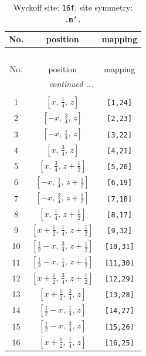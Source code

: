 \documentclass[fleqn,8pt]{jsarticle}
\begin{document}
\renewcommand{\arraystretch}{1.2}
\begin{longtable}{ccc}
\caption{Wyckoff site: {\tt 16f}, site symmetry: {\tt .m'.}}
 \\
 \hline \hline
No. & position & mapping \\ \hline \endfirsthead

\multicolumn{2}{l}{\tablename\ \thetable{}} \\
 \hline \hline
No. & position & mapping \\ \hline \endhead

 \hline \hline
\multicolumn{2}{r}{\footnotesize\it continued ...} \\ \endfoot

 \hline \hline
\multicolumn{2}{r}{} \\ \endlastfoot

1 & $\left[ x,\, \frac{1}{4},\, z \right]$ & {\tt [1,24]} \\ \hline
2 & $\left[ - x,\, \frac{3}{4},\, z \right]$ & {\tt [2,23]} \\ \hline
3 & $\left[ - x,\, \frac{1}{4},\, z \right]$ & {\tt [3,22]} \\ \hline
4 & $\left[ x,\, \frac{3}{4},\, z \right]$ & {\tt [4,21]} \\ \hline
5 & $\left[ x,\, \frac{3}{4},\, z + \frac{1}{2} \right]$ & {\tt [5,20]} \\ \hline
6 & $\left[ - x,\, \frac{1}{4},\, z + \frac{1}{2} \right]$ & {\tt [6,19]} \\ \hline
7 & $\left[ - x,\, \frac{3}{4},\, z + \frac{1}{2} \right]$ & {\tt [7,18]} \\ \hline
8 & $\left[ x,\, \frac{1}{4},\, z + \frac{1}{2} \right]$ & {\tt [8,17]} \\ \hline
9 & $\left[ x + \frac{1}{2},\, \frac{1}{4},\, z + \frac{1}{2} \right]$ & {\tt [9,32]} \\ \hline
10 & $\left[ \frac{1}{2} - x,\, \frac{3}{4},\, z + \frac{1}{2} \right]$ & {\tt [10,31]} \\ \hline
11 & $\left[ \frac{1}{2} - x,\, \frac{1}{4},\, z + \frac{1}{2} \right]$ & {\tt [11,30]} \\ \hline
12 & $\left[ x + \frac{1}{2},\, \frac{3}{4},\, z + \frac{1}{2} \right]$ & {\tt [12,29]} \\ \hline
13 & $\left[ x + \frac{1}{2},\, \frac{3}{4},\, z \right]$ & {\tt [13,28]} \\ \hline
14 & $\left[ \frac{1}{2} - x,\, \frac{1}{4},\, z \right]$ & {\tt [14,27]} \\ \hline
15 & $\left[ \frac{1}{2} - x,\, \frac{3}{4},\, z \right]$ & {\tt [15,26]} \\ \hline
16 & $\left[ x + \frac{1}{2},\, \frac{1}{4},\, z \right]$ & {\tt [16,25]} \\
\end{longtable}
\end{document}
